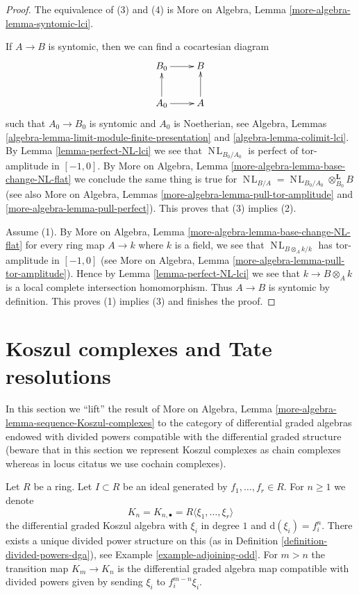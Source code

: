 \documentclass{stacks-project}
\theoremstyle{plain}
\theoremstyle{definition}
\theoremstyle{remark}
\numberwithin{equation}{subsection}
\def\NL{\mathop{N\!L}\nolimits}
\begin{document}
\begin{proof}
The equivalence of (3) and (4) is More on Algebra, Lemma
\ref{more-algebra-lemma-syntomic-lci}.

\medskip\noindent
If $A \to B$ is syntomic, then we can find a cocartesian diagram
$$
\xymatrix{
B_0 \ar[r] & B \\
A_0 \ar[r] \ar[u] & A \ar[u]
}
$$
such that $A_0 \to B_0$ is syntomic and $A_0$ is Noetherian, see
Algebra, Lemmas \ref{algebra-lemma-limit-module-finite-presentation} and
\ref{algebra-lemma-colimit-lci}. By Lemma \ref{lemma-perfect-NL-lci}
we see that $\NL_{B_0/A_0}$ is perfect of tor-amplitude in $[-1, 0]$.
By More on Algebra, Lemma \ref{more-algebra-lemma-base-change-NL-flat}
we conclude the same thing is true for
$\NL_{B/A} = \NL_{B_0/A_0} \otimes_{B_0}^\mathbf{L} B$ (see
also More on Algebra, Lemmas \ref{more-algebra-lemma-pull-tor-amplitude} and
\ref{more-algebra-lemma-pull-perfect}).
This proves that (3) implies (2).

\medskip\noindent
Assume (1). By More on Algebra, Lemma
\ref{more-algebra-lemma-base-change-NL-flat}
for every ring map $A \to k$ where
$k$ is a field, we see that $\NL_{B \otimes_A k/k}$ has
tor-amplitude in $[-1, 0]$ (see
More on Algebra, Lemma \ref{more-algebra-lemma-pull-tor-amplitude}).
Hence by Lemma \ref{lemma-perfect-NL-lci} we see that $k \to B \otimes_A k$ is
a local complete intersection homomorphism. Thus $A \to B$
is syntomic by definition. This proves (1) implies (3)
and finishes the proof.
\end{proof}





\section{Koszul complexes and Tate resolutions}
\label{section-koszul-vs-tate}

\noindent
In this section we ``lift'' the result of
More on Algebra, Lemma \ref{more-algebra-lemma-sequence-Koszul-complexes}
to the category of differential graded algebras endowed with divided
powers compatible with the differential graded structure (beware
that in this section we represent Koszul complexes as chain complexes
whereas in locus citatus we use cochain complexes).

\medskip\noindent
Let $R$ be a ring. Let $I \subset R$ be an ideal generated
by $f_1, \ldots, f_r \in R$. For $n \geq 1$ we denote
$$
K_n = K_{n, \bullet} = R\langle \xi_1, \ldots, \xi_r\rangle
$$
the differential graded Koszul algebra with $\xi_i$ in degree $1$ and
$\text{d}(\xi_i) = f_i^n$. There exists a unique divided power structure on this
(as in Definition \ref{definition-divided-powers-dga}), see
Example \ref{example-adjoining-odd}. For $m > n$ the transition map
$K_m \to K_n$ is the differential graded algebra map compatible with
divided powers given by sending $\xi_i$ to $f_i^{m - n}\xi_i$.
\end{document}
